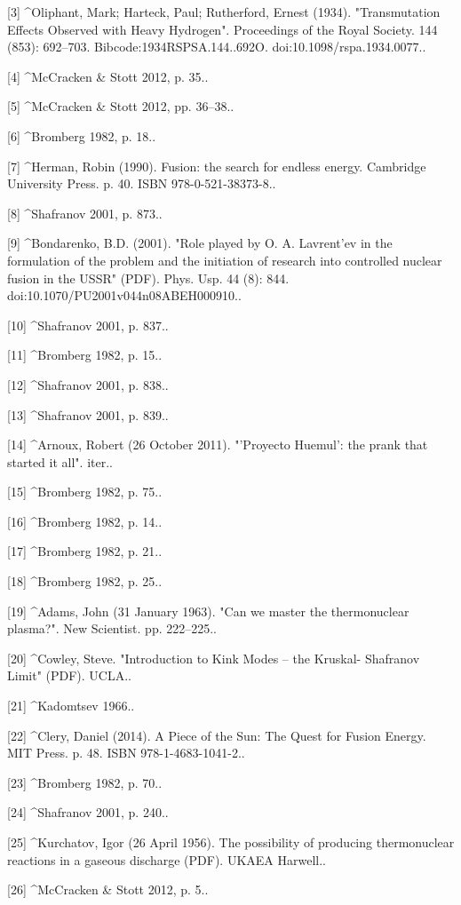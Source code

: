 [3]
^Oliphant, Mark; Harteck, Paul; Rutherford, Ernest (1934). "Transmutation Effects Observed with Heavy Hydrogen". Proceedings of the Royal Society. 144 (853): 692–703. Bibcode:1934RSPSA.144..692O. doi:10.1098/rspa.1934.0077..

[4]
^McCracken & Stott 2012, p. 35..

[5]
^McCracken & Stott 2012, pp. 36–38..

[6]
^Bromberg 1982, p. 18..

[7]
^Herman, Robin (1990). Fusion: the search for endless energy. Cambridge University Press. p. 40. ISBN 978-0-521-38373-8..

[8]
^Shafranov 2001, p. 873..

[9]
^Bondarenko, B.D. (2001). "Role played by O. A. Lavrent'ev in the formulation of the problem and the initiation of research into controlled nuclear fusion in the USSR" (PDF). Phys. Usp. 44 (8): 844. doi:10.1070/PU2001v044n08ABEH000910..

[10]
^Shafranov 2001, p. 837..

[11]
^Bromberg 1982, p. 15..

[12]
^Shafranov 2001, p. 838..

[13]
^Shafranov 2001, p. 839..

[14]
^Arnoux, Robert (26 October 2011). "'Proyecto Huemul': the prank that started it all". iter..

[15]
^Bromberg 1982, p. 75..

[16]
^Bromberg 1982, p. 14..

[17]
^Bromberg 1982, p. 21..

[18]
^Bromberg 1982, p. 25..

[19]
^Adams, John (31 January 1963). "Can we master the thermonuclear plasma?". New Scientist. pp. 222–225..

[20]
^Cowley, Steve. "Introduction to Kink Modes – the Kruskal- Shafranov Limit" (PDF). UCLA..

[21]
^Kadomtsev 1966..

[22]
^Clery, Daniel (2014). A Piece of the Sun: The Quest for Fusion Energy. MIT Press. p. 48. ISBN 978-1-4683-1041-2..

[23]
^Bromberg 1982, p. 70..

[24]
^Shafranov 2001, p. 240..

[25]
^Kurchatov, Igor (26 April 1956). The possibility of producing thermonuclear reactions in a gaseous discharge (PDF). UKAEA Harwell..

[26]
^McCracken & Stott 2012, p. 5..

